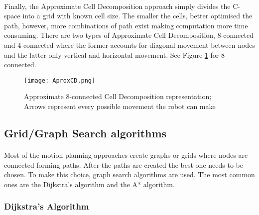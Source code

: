 \paragraph{}Finally, the Approximate Cell Decomposition approach simply divides the C-space into a grid with known cell size. The smaller the cells, 
better optimised the path, however, more combinations of path exist making computation more time consuming. There are two types of Approximate Cell Decomposition, 
8-connected and 4-connected where the former accounts for diagonal movement between nodes and the latter only vertical and horizontal movement. 
See Figure \ref{fig:ApproximateCellDecomposition} for 8-connected.
\begin{figure}[H]
    \centering
    \texttt{[image: AproxCD.png]}
    \caption{Approximate 8-connected Cell Decomposition representation; Arrows represent every possible movement the robot can make}
    \label{fig:ApproximateCellDecomposition}
\end{figure}
\subsection{Grid/Graph Search algorithms}
\label{subsec:GSA}
\paragraph{}Most of the motion planning approaches create graphs or grids where nodes are connected forming paths. After the paths
are created the best one needs to be chosen. To make this choice, graph search algorithms are used. The most common ones 
are the Dijkstra's algorithm and the A* algorithm.
\subsubsection{Dijkstra's Algorithm}
\label{subsubsec:Dijkstra}
